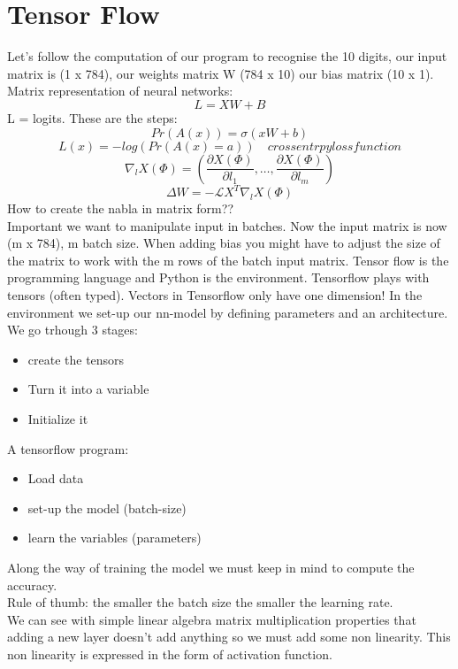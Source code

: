 \section{Tensor Flow}
Let's follow the computation of our program to recognise the 10 digits, our input matrix is (1 x 784), our weights matrix W (784 x 10) our bias matrix (10 x 1).\\
Matrix representation of neural networks:
\[ 
     L = XW + B
\]L = logits. These are the steps:\[ 
    Pr(A(x)) = \sigma(xW +b) 
\]
\[ 
    L(x) = -log(Pr(A(x)=a)) \quad cross entrpy loss function
\]
\[ 
    \nabla_l X(\Phi) = \left( \frac{\partial X(\Phi)}{\partial l_1}, \ldots, \frac{\partial X(\Phi)}{\partial l_m} \right) 
\]
\[ 
    \Delta W = -\mathcal{L}X^T\nabla_l X(\Phi) 
\]How to create the nabla in matrix form??\\
Important we want to manipulate input in batches. Now the input matrix is now (m x 784), m batch size. When adding bias you might have to adjust the size of the matrix to work with the m rows of the batch input matrix. Tensor flow is the programming language and Python is the environment. Tensorflow plays with tensors (often typed). Vectors in Tensorflow only have one dimension! In the environment we set-up our nn-model by defining parameters and an architecture. We go trhough 3 stages: 
\begin{itemize}
    \item create the tensors
    \item Turn it into a variable
    \item Initialize it
\end{itemize}
A tensorflow program:
\begin{itemize}
    \item Load data
    \item set-up the model (batch-size)
    \item learn the variables (parameters)
\end{itemize}
Along the way of training the model we must keep in mind to compute the accuracy.\\ Rule of thumb: the smaller the batch size the smaller the learning rate.\\
We can see with simple linear algebra matrix multiplication properties that adding a new layer doesn't add anything so we must add some non linearity. This non linearity is expressed in the form of activation function. 
